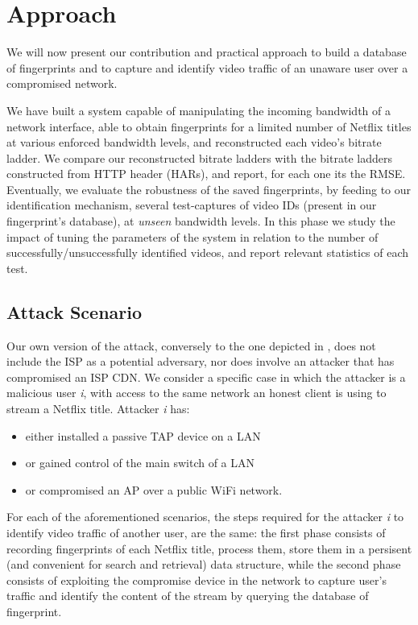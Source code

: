 \chapter{Approach}\label{sec:approach}

We will now present our contribution and practical approach to build a database
of fingerprints and to capture and identify video traffic of an unaware user
over a compromised network.

We have built a system capable of manipulating the incoming bandwidth of a
network interface, able to obtain fingerprints for a limited number of Netflix
titles at various enforced bandwidth levels, and reconstructed each video's
bitrate ladder. We compare our reconstructed bitrate ladders with the bitrate
ladders constructed from HTTP header (HARs), and report, for each one its the
RMSE.  Eventually, we evaluate the robustness of the saved fingerprints, by
feeding to our identification mechanism, several test-captures of video IDs
(present in our fingerprint's database), at \emph{unseen} bandwidth levels. In
this phase we study the impact of tuning the parameters of the system in
relation to the number of successfully/unsuccessfully identified videos, and
report relevant statistics of each test.

\section{Attack Scenario}

Our own version of the attack, conversely to the one depicted in
, does not include the ISP as a potential adversary, nor does
involve an attacker that has compromised an ISP CDN.  We consider a specific
case in which the attacker is a malicious user \emph{i}, with access to the
same network an honest client is using to stream a Netflix title. Attacker
\emph{i} has:

\begin{itemize}
    \item either installed a passive TAP device on a LAN
    \item or gained control of the main switch of a LAN
    \item or compromised an AP over a public WiFi network.
\end{itemize}

For each of the aforementioned scenarios, the steps required for the attacker
\emph{i} to identify video traffic of another user, are the same: the first
phase consists of recording fingerprints of each Netflix title, process them,
store them in a persisent (and convenient for search and retrieval) data
structure, while the second phase consists of exploiting the compromise device
in the network to capture user's traffic and identify the content of the stream
by querying the database of fingerprint.


